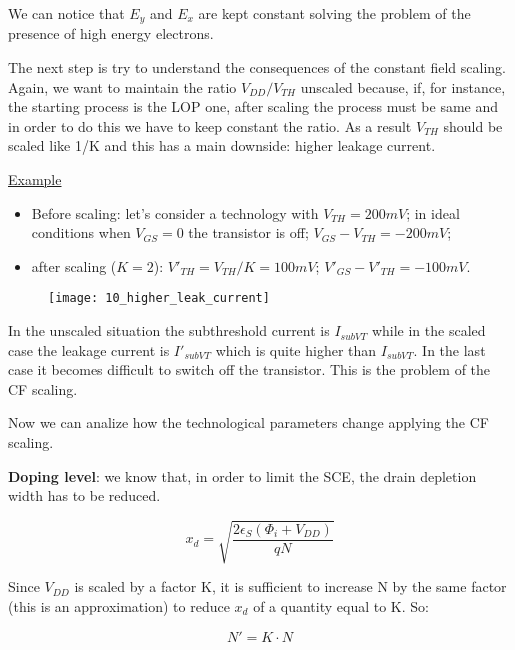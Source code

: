 \documentclass[a4paper, 12pt, twoside, openright]{report}
\begin{document}
We can notice that $E_{y}$ and $E_{x}$ are kept constant solving the problem of the presence of high energy electrons.

The next step is try to understand the consequences of the constant field scaling. Again, we want to maintain the ratio $V_{DD}/V_{TH}$ unscaled because, if, for instance, the starting process is the LOP one, after scaling the process must be same and in order to do this we have to keep constant the ratio. As a result $V_{TH}$ should be scaled like 1/K and this has a main downside: higher leakage current.

\newpage

\underline{Example}

	\begin{itemize}
	\item Before scaling: let's consider a technology with $V_{TH} = 200 mV$; in ideal conditions when $V_{GS} = 0$ the transistor is off; $V_{GS} - V_{TH} = -200 mV$;
	\item after scaling ($K = 2$): $V'_{TH} = V_{TH}/K = 100 mV$; $V'_{GS} - V'_{TH} = -100 mV$.
	\end{itemize}

	\begin{figure}[H]
	\centering
	\texttt{[image: 10\_higher\_leak\_current]}
	\caption{}
	\label{}
	\end{figure}

In the unscaled situation the subthreshold current is $I_{subVT}$ while in the scaled case the leakage current is $I'_{subVT}$ which is quite higher than $I_{subVT}$. In the last case it becomes difficult to switch off the transistor. This is the problem of the CF scaling.

Now we can analize how the technological parameters change applying the CF scaling.

\textbf{Doping level}: we know that, in order to limit the SCE, the drain depletion width has to be reduced.

	\begin{equation}
	x_d=\sqrt{\frac{2\epsilon_S(\Phi_i+V_{DD})}{qN}}
	\end{equation}

Since $V_{DD}$ is scaled by a factor K, it is sufficient to increase N by the same factor (this is an approximation) to reduce $x_{d}$ of a quantity equal to K. So:

	\begin{equation}
	N' = K \cdot N
	\end{equation}
\end{document}
